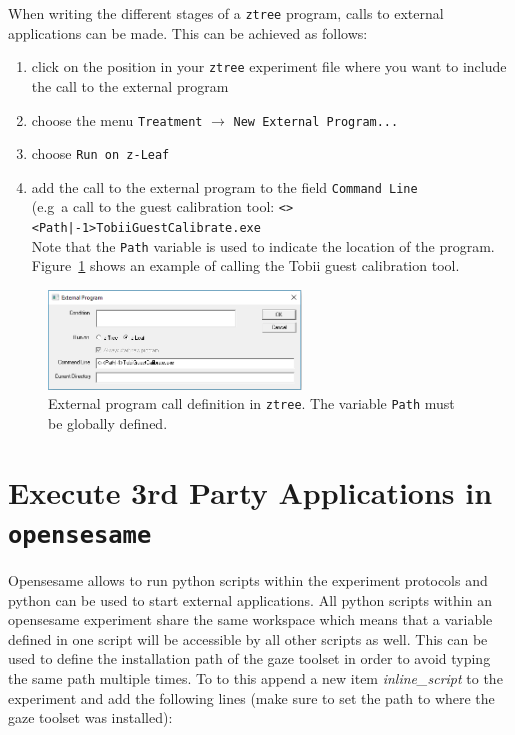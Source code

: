 \documentclass[a4paper,oneside]{book}
\begin{document}
When writing the different stages of a \texttt{ztree} program, calls to external applications can be made.
This can be achieved as follows:
\begin{enumerate}
    \item click on the position in your \texttt{ztree} experiment file where you want to include the call to the external program
    \item choose the menu \texttt{Treatment} $\rightarrow$ \texttt{New External Program...}
    \item choose \texttt{Run on z-Leaf}
    \item add the call to the external program to the field \texttt{Command Line} \\
        (e.g~a call to the guest calibration tool: \texttt{<><Path|-1>TobiiGuestCalibrate.exe}\\
        Note that the \texttt{Path} variable is used to indicate the location of the program.
        Figure~\ref{fig.extcall} shows an example of calling the Tobii guest calibration tool.
\end{enumerate}
\begin{figure}[ht]
    \centering
    \includegraphics[width=0.6\textwidth]{ztree_extcall.png}
    \caption{External program call definition in \texttt{ztree}. The variable \texttt{Path} must be globally defined.}
    \label{fig.extcall}
\end{figure}

\section{Execute 3rd Party Applications in \texttt{opensesame}}
\label{sec.external.opensesame}

Opensesame allows to run python scripts within the experiment protocols and python can be used to start external applications.
All python scripts within an opensesame experiment share the same workspace which means that a variable defined in one script will be accessible by all other scripts as well.
This can be used to define the installation path of the gaze toolset in order to avoid typing the same path multiple times.
To to this append a new item \emph{inline\_script} to the experiment and add the following lines (make sure to set the path to where the gaze toolset was installed):
\end{document}
